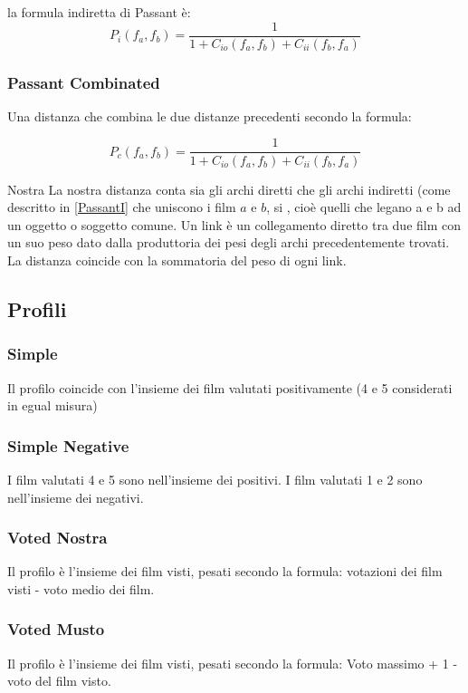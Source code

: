 la formula indiretta di Passant è:
    \begin{equation}
        P_{i}(f_{a},f_{b}) = \frac{1} {1+C_{io}(f_{a},f_{b})+C_{ii}(f_{b},f_{a})}
    \end{equation}


\subsubsection{Passant Combinated}
Una distanza che combina le due distanze precedenti secondo la formula:

    \begin{equation}
P_{c}(f_{a},f_{b}) = \frac{1} {1+C_{io}(f_{a},f_{b})+C_{ii}(f_{b},f_{a})}
    \end{equation}


Nostra
La nostra distanza conta sia gli archi diretti che gli archi indiretti (come descritto in \ref{PassantI} che uniscono i film $a$ e $b$, si , cioè quelli che legano a e b ad un oggetto o soggetto comune.
Un link è un collegamento diretto tra due film con un suo peso dato dalla produttoria dei pesi degli archi precedentemente trovati.
La distanza coincide con la sommatoria del peso di ogni link.



\subsection{Profili}

\subsubsection{Simple}
Il profilo coincide con l'insieme dei film valutati positivamente (4 e 5 considerati in egual misura)

\subsubsection{Simple Negative}

I film valutati 4 e 5 sono nell'insieme dei positivi. I film valutati 1 e 2 sono nell'insieme dei negativi.


\subsubsection{Voted Nostra}


Il profilo è l'insieme dei film visti, pesati secondo la formula:
votazioni dei film visti - voto medio dei film.

\subsubsection{Voted Musto}

Il profilo è l'insieme dei film visti, pesati secondo la formula:
Voto massimo + 1 - voto del film visto. 

